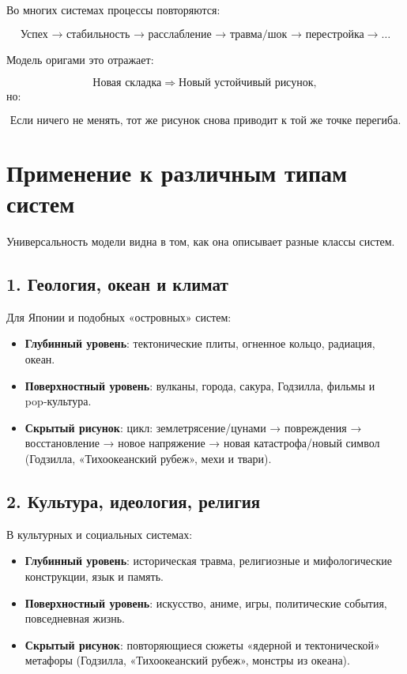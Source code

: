 \documentclass[12pt]{article}
\begin{document}
Во многих системах процессы повторяются:

\[
 \text{Успех → стабильность → расслабление → травма/шок → перестройка} \rightarrow \dots
\]

Модель оригами это отражает:

\[
 \text{Новая складка} \Rightarrow \text{Новый устойчивый рисунок},
\]
но:

\[
 \text{Если ничего не менять, тот же рисунок снова приводит к той же точке перегиба}.
\]

\section{Применение к различным типам систем}

Универсальность модели видна в том, как она описывает разные классы систем.

\subsection{1. Геология, океан и климат}

Для Японии и подобных «островных» систем:

\begin{itemize}
  \item \textbf{Глубинный уровень}: тектонические плиты, огненное кольцо, радиация, океан.
  \item \textbf{Поверхностный уровень}: вулканы, города, сакура, Годзилла, фильмы и pop‑культура.
  \item \textbf{Скрытый рисунок}: цикл: землетрясение/цунами → повреждения → восстановление → новое напряжение → новая катастрофа/новый символ (Годзилла, «Тихоокеанский рубеж», мехи и твари).
\end{itemize}

\subsection{2. Культура, идеология, религия}

В культурных и социальных системах:

\begin{itemize}
  \item \textbf{Глубинный уровень}: историческая травма, религиозные и мифологические конструкции, язык и память.
  \item \textbf{Поверхностный уровень}: искусство, аниме, игры, политические события, повседневная жизнь.
  \item \textbf{Скрытый рисунок}: повторяющиеся сюжеты «ядерной и тектонической» метафоры (Годзилла, «Тихоокеанский рубеж», монстры из океана).
\end{itemize}
\end{document}
